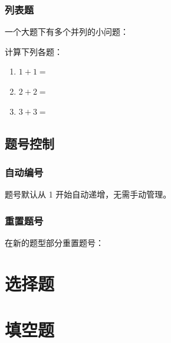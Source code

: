 \subsubsection{列表题}

一个大题下有多个并列的小问题：

\begin{latexcode}
  \begin{question}
    计算下列各题：
    \begin{enumerate}
      \item $1 + 1 = $ \fillin[2]
      \item $2 + 2 = $ \fillin[4]
      \item $3 + 3 = $ \fillin[6]
    \end{enumerate}
  \end{question}
\end{latexcode}


\subsection{题号控制}

\subsubsection{自动编号}

题号默认从 1 开始自动递增，无需手动管理。

\subsubsection{重置题号}

在新的题型部分重置题号：

\begin{latexcode}
  \section{选择题}
  \begin{question}
  \end{question}

  \section{填空题}
  \begin{question}
  \end{question}
\end{latexcode}

